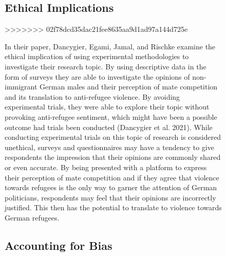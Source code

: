 \documentclass[
]{article}
\begin{document}
\begin{figure}
{\subsection{Ethical Implications}\label{ethical-implications}}
>>>>>>> 02f78dcd35dac21fee8635aa9d1ad97a144d725e

In their paper, Dancygier, Egami, Jamal, and Rischke examine the ethical
implication of using experimental methodologies to investigate their
research topic. By using descriptive data in the form of surveys they
are able to investigate the opinions of non-immigrant German males and
their perception of mate competition and its translation to anti-refugee
violence. By avoiding experimental trials, they were able to explore
their topic without provoking anti-refugee sentiment, which might have
been a possible outcome had trials been conducted (Dancygier et al.
2021). While conducting experimental trials on this topic of research is
considered unethical, surveys and questionnaires may have a tendency to
give respondents the impression that their opinions are commonly shared
or even accurate. By being presented with a platform to express their
perception of mate competition and if they agree that violence towards
refugees is the only way to garner the attention of German politicians,
respondents may feel that their opinions are incorrectly justified. This
then has the potential to translate to violence towards German refugees.

\hypertarget{accounting-for-bias}{%
\subsection{Accounting for Bias}\label{accounting-for-bias}}


\end{figure}
\end{document}
